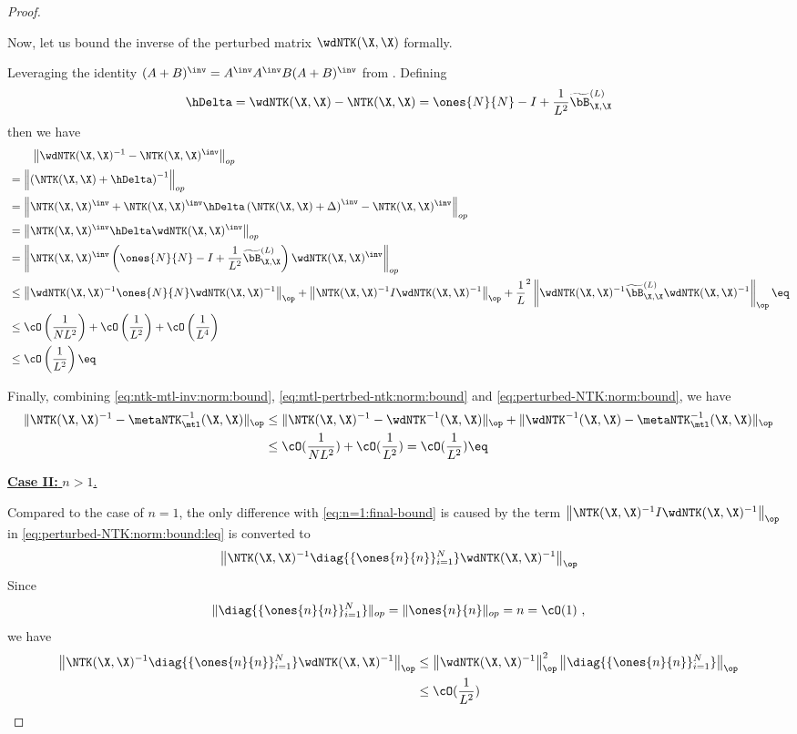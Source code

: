 \documentclass{article}
\begin{document}
\begin{proof}
\begin{itemize}
Now, let us bound the inverse of the perturbed matrix $\wdNTK(\X,\X)$ formally. 

Leveraging the identity $(A+B)^\inv = A^\inv A^\inv B (A+B)^\inv$ from \cite{henderson1981deriving}. Defining $$\hDelta = \wdNTK(\X,\X) - \NTK(\X,\X)=\ones{N}{N} - I + \frac{1}{L^2} \widetilde{\bB}^{(L)}_{\X,\X}$$
then we have
\begin{align*}
  &\qquad \left\|\wdNTK(\X,\X)^{-1} - \NTK(\X,\X)^\inv \right\|_{op}\\
  &= \left\|\left(\NTK(\X,\X) + \hDelta\right)^{-1}\right\|_{op}\\
  &=\left\|\NTK(\X,\X)^\inv + \NTK(\X,\X)^\inv \hDelta \left(\NTK(\X,\X) + \Delta \right)^\inv -\NTK(\X,\X)^\inv \right\|_{op}\\
  & = \left\|\NTK(\X,\X)^\inv \hDelta \wdNTK(\X,\X)^\inv \right\|_{op}\\
  & = \left\|\NTK(\X,\X)^\inv \left(\ones{N}{N} - I + \frac{1}{L^2} \widetilde{\bB}^{(L)}_{\X,\X}\right) \wdNTK(\X,\X)^\inv \right\|_{op} \\
  &\leq \left\| \wdNTK(\X,\X)^{-1}\ones{N}{N} \wdNTK(\X,\X)^{-1} \right\|_\op 
    + \left\| \NTK(\X,\X)^{-1}I\wdNTK(\X,\X)^{-1} \right\|_\op
    + \frac 1 L^2 \left\| \wdNTK(\X,\X)^{-1}\widetilde{\bB}^{(L)}_{\X,\X} \wdNTK(\X,\X)^{-1} \right\|_\op\eq\label{eq:perturbed-NTK:norm:bound:leq}\\
    &\leq \cO\left(\frac{1}{NL^2}\right) +\cO\left(\frac{1}{L^2}\right) + \cO\left(\frac{1}{L^4}\right) \\
    &\leq \cO\left(\frac{1}{L^2}\right)\eq\label{eq:perturbed-NTK:norm:bound}
\end{align*}
\end{itemize}

Finally, combining \eqref{eq:ntk-mtl-inv:norm:bound}, \eqref{eq:mtl-pertrbed-ntk:norm:bound} and \eqref{eq:perturbed-NTK:norm:bound}, we have 
\begin{align*}
 \|\NTK(\X,\X)^{-1} - \metaNTK_\mtl^{-1}(\X,\X)\|_{\op}
    &\leq \|\NTK(\X,\X)^{-1} - \wdNTK^{-1}(\X,\X)\|_{\op} + \|\wdNTK^{-1}(\X,\X) - \metaNTK_\mtl^{-1}(\X,\X)\|_{\op}    \\
    &\leq \cO(\frac{1}{NL^2}) + \cO(\frac{1}{L^2}) = \cO(\frac{1}{L^2})\label{eq:n=1:final-bound}\eq
\end{align*}


\underline{\textbf{Case II:} $n>1$.}

Compared to the case of $n=1$, the only difference with \eqref{eq:n=1:final-bound} is caused by the term $\left\| \NTK(\X,\X)^{-1}I\wdNTK(\X,\X)^{-1} \right\|_\op$ in \eqref{eq:perturbed-NTK:norm:bound:leq} is converted to 
$$\left\|\NTK(\X,\X)^{-1}\diag{\{\ones{n}{n}\}_{i=1}^N}\wdNTK(\X,\X)^{-1} \right\|_\op$$
Since $$\|\diag{\{\ones{n}{n}\}_{i=1}^N}\|_{op} = \|\ones{n}{n}\|_{op}=  n = \cO(1)~,$$
we have
\begin{align*}
    \left\| \NTK(\X,\X)^{-1}\diag{\{\ones{n}{n}\}_{i=1}^N}\wdNTK(\X,\X)^{-1} \right\|_\op &\leq \left\|\wdNTK(\X,\X)^{-1}\right\|_\op^2
    \left\|\diag{\{\ones{n}{n}\}_{i=1}^N}\right\|_\op\\
    &\leq \cO(\frac{1}{L^2})
\end{align*}
\end{proof}
\end{document}
